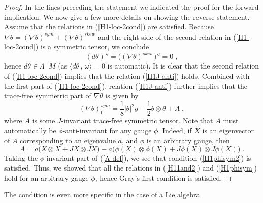 \documentclass{amsart}
\begin{document}
\begin{proof} In the lines preceding the statement we indicated the proof for the forward implication. We now give a few more details on showing the reverse statement. Assume that the relations in (\ref{H1-loc-2cond}) are satisfied. Because $\nabla \theta = (\nabla \theta)^{sym} + (\nabla \theta)^{skew} $ and the right side of the second relation in (\ref{H1-loc-2cond}) is a symmetric tensor, we conclude 
$$ (d\theta)'' = \big( (\nabla \theta)^{skew} \big)'' = 0 \; ,$$
hence $d \theta \in \Lambda^{-}M$ (as $\langle d\theta \, , \, \omega \rangle = 0$ is automatic). It is clear that the second relation of (\ref{H1-loc-2cond}) implies that the relation (\ref{H1J-anti}) holds. Combined with the first part of (\ref{H1-loc-2cond}), relation (\ref{H1J-anti}) further implies that the trace-free symmetric part of $\nabla \theta$ is given by 
\begin{equation} \label{A-def}
       (\nabla \theta)_0^{sym} = \frac{1}{8} |\theta|^2 g - \frac{1}{2} \theta \otimes \theta + A \; , 
\end{equation}
where $A$ is some $J$-invariant trace-free symmetric tensor. Note that $A$ must automatically be $\phi$-anti-invariant for any gauge $\phi$. Indeed, if $X$ is an eigenvector of $A$ corresponding to an eigenvalue $a$, and $\phi$ is an arbitrary gauge, then
$$ A = a \big( X \otimes X + JX \otimes JX \big) - a \big( \phi(X) \otimes \phi(X) + J\phi(X) \otimes J\phi(X) \big) \; .$$
Taking the $\phi$-invariant part of (\ref{A-def}), we see that condition (\ref{H1phisym2}) is satisfied. Thus, we showed that all the relations in (\ref{H11and2}) and (\ref{H1phisym}) hold for an arbitrary gauge $\phi$, hence Gray's first condition is satisfied.
\end{proof}


\vspace{0.2cm}

\noindent
The condition is even more specific in the case of a Lie algebra.
\end{document}
